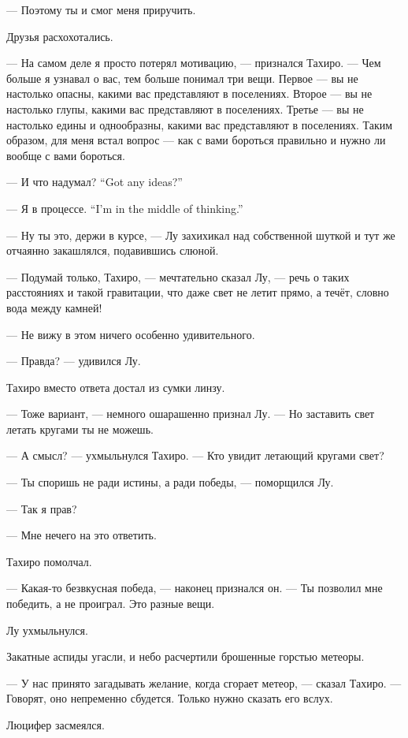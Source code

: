 --- Поэтому ты и смог меня приручить.

Друзья расхохотались.

--- На самом деле я просто потерял мотивацию, --- признался Тахиро.
--- Чем больше я узнавал о вас, тем больше понимал три вещи.
Первое --- вы не настолько опасны, какими вас представляют в поселениях.
Второе --- вы не настолько глупы, какими вас представляют в поселениях.
Третье --- вы не настолько едины и однообразны, какими вас представляют в поселениях.
Таким образом, для меня встал вопрос --- как с вами бороться правильно и нужно ли вообще с вами бороться.

{--- И что надумал?}
{``Got any ideas?''}

{--- Я в процессе.}
{``I'm in the middle of thinking.''}

--- Ну ты это, держи в курсе, --- Лу захихикал над собственной шуткой и тут же отчаянно закашлялся, подавившись слюной.

\textspace

--- Подумай только, Тахиро, --- мечтательно сказал Лу, --- речь о таких расстояниях и такой гравитации, что даже свет не летит прямо, а течёт, словно вода между камней!

--- Не вижу в этом ничего особенно удивительного.

--- Правда? --- удивился Лу.

Тахиро вместо ответа достал из сумки линзу.

--- Тоже вариант, --- немного ошарашенно признал Лу.
--- Но заставить свет летать кругами ты не можешь.

--- А смысл? --- ухмыльнулся Тахиро.
--- Кто увидит летающий кругами свет?

--- Ты споришь не ради истины, а ради победы, --- поморщился Лу.

--- Так я прав?

--- Мне нечего на это ответить.

Тахиро помолчал.

--- Какая-то безвкусная победа, --- наконец признался он.
--- Ты позволил мне победить, а не проиграл.
Это разные вещи.

Лу ухмыльнулся.

Закатные аспиды угасли, и небо расчертили брошенные горстью метеоры.

--- У нас принято загадывать желание, когда сгорает метеор, --- сказал Тахиро.
--- Говорят, оно непременно сбудется.
Только нужно сказать его вслух.

Люцифер засмеялся.

